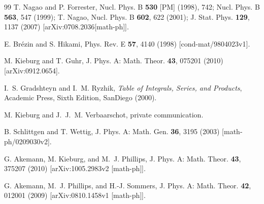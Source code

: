 \documentclass[11pt]{article}
\begin{document}
\begin{thebibliography}{99}
 T. Nagao and P. Forrester, Nucl. Phys. B {\bf 530} [PM]
(1998), 742; %
Nucl. Phys. B {\bf 563}, 547 (1999);\newline
T. Nagao, Nucl. Phys. B {\bf 602}, 622 (2001);
J. Stat. Phys. {\bf 129}, 1137 (2007) [arXiv:0708.2036[math-ph]].

E. Br\'ezin and S. Hikami,
Phys. Rev. E {\bf  57}, 4140 (1998)
[cond-mat/9804023v1].

 M. Kieburg and T. Guhr,
J. Phys. {A}: Math. Theor. {\bf
43}, 075201 (2010) 
[arXiv:0912.0654].%

  I.~S. Gradshteyn and I.~M. Ryzhik, {\it Table of Integrals,
Series, and Products}, Academic Press, Sixth Edition, SanDiego (2000).

 M. Kieburg and J.~J.~M. Verbaarschot, private communication.
  
 B. Schlittgen and T. Wettig, J. Phys. A: Math. Gen. 
 {\bf 36}, 3195  (2003) [math-ph/0209030v2].

 G. Akemann, M. Kieburg, and M.~J. Phillips,
J. Phys. { A}: Math. Theor. {\bf 43}, 375207 (2010) 
[arXiv:1005.2983v2 [math-ph]]. 

G. Akemann,  M.~J. Phillips, and H.-J. Sommers, J. Phys. {
  A}: Math. Theor. {\bf 42},  012001 (2009)
[arXiv:0810.1458v1 [math-ph]].
 


\end{thebibliography}
\end{document}
